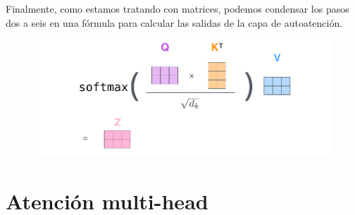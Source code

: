 \begin{itemize}
Finalmente, como estamos tratando con matrices, podemos condensar los pasos dos a seis en una fórmula para calcular las salidas de la capa de autoatención.

\begin{figure}[h]
  \centering
  \includegraphics[scale=0.35]{pics/self-attention-matrix-calculation-2.png}
\end{figure}

\end{itemize}
        
\section{Atención multi-head}

